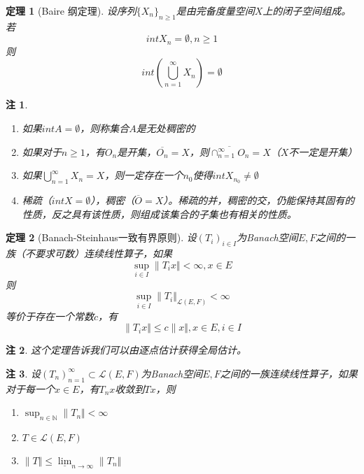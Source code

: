 \documentclass{article}                     %
\numberwithin{equation}{section}            %
\numberwithin{figure}{section}              %
\numberwithin{table}{section}               %
\newtheorem{theorem}{\indent 定理}[section] %
\newtheorem{remark}{\indent 注}[section]
\begin{document}
\begin{theorem}[Baire 纲定理]
    设序列$\{X_n\}_{n\ge 1}$是由完备度量空间$X$上的闭子空间组成。若
    $$int {X_n}=\emptyset ,n\ge 1$$
    则
    $$int(\bigcup _{n=1}^{\infty}X_n)=\emptyset$$
\end{theorem}
\begin{remark}
    \begin{enumerate}
        \item 如果$int{A}=\emptyset$，则称集合$A$是无处稠密的
        \item 如果对于$n\ge 1$，有$O_n$是开集，$\overline{O_n}=X $，则$\overline{\cap _{n=1}^{\infty }O_n}=X $（$X$不一定是开集）
        \item 如果$\bigcup _{n=1}^{\infty}X_n=X$，则一定存在一个$n_0$使得$int{X_{n_0}}\neq \emptyset$
        \item 稀疏（$int X=\emptyset$），稠密（$\overline{O}=X$）。稀疏的并，稠密的交，仍能保持其固有的性质，反之具有该性质，则组成该集合的子集也有相关的性质。
    \end{enumerate}
\end{remark}












\begin{theorem}[Banach-Steinhaus一致有界原则]
    设$(T_i)_{i\in I}$为Banach空间$E,F$之间的一族（不要求可数）连续线性算子，如果
    $$\sup_{i\in I}\| T_ix\Vert < \infty ,x\in E $$
    则
    $$\sup_{i\in I}\| T_i\Vert_{\mathcal{L} (E,F)} < \infty $$
    等价于存在一个常数$c$，有
    $$\| T_ix\Vert \le c\| x\Vert ,x\in E,i\in I$$
\end{theorem}
\begin{remark}
    这个定理告诉我们可以由逐点估计获得全局估计。
\end{remark}
\begin{remark}
    设$(T_n)_{n=1}^{\infty }\subset \mathcal{L} (E,F)$为Banach空间$E,F$之间的一族连续线性算子，如果对于每一个$x\in E$，有$T_nx$收敛到$Tx$，则
    \begin{enumerate}
        \item $\sup_{n\in \mathbb{N} }\| T_n\Vert < \infty $
        \item $T\in \mathcal{L} (E,F)$
        \item $\| T\Vert \le \underline{\lim}_{n\to \infty} \| T_n\Vert$
    \end{enumerate}
\end{remark}
\end{document}
